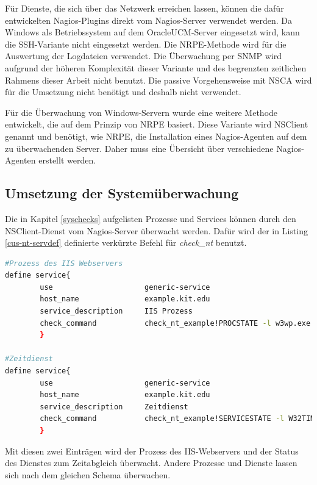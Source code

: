 Für Dienste, die sich über das Netzwerk erreichen lassen, können die dafür entwickelten Nagios-Plugins direkt vom Nagios-Server verwendet werden.
Da Windows als Betriebssystem auf dem \gls{OracleUCM}-Server eingesetzt wird, kann die \gls{SSH}-Variante nicht eingesetzt werden.
Die \gls{NRPE}-Methode wird für die Auswertung der Logdateien verwendet.
Die Überwachung per \gls{SNMP} wird aufgrund der höheren Komplexität dieser Variante und des begrenzten zeitlichen Rahmens dieser Arbeit nicht benutzt.\label{snmpkom}
Die passive Vorgehensweise mit \gls{NSCA} wird für die Umsetzung nicht benötigt und deshalb nicht verwendet.

Für die Überwachung von Windows-Servern wurde eine weitere Methode entwickelt, die auf dem Prinzip von \gls{NRPE} basiert.
Diese Variante wird NSClient genannt und benötigt, wie \gls{NRPE}, die Installation eines Nagios-Agenten auf dem zu überwachenden Server.
Daher muss eine Übersicht über verschiedene Nagios-Agenten erstellt werden.



\subsection{Umsetzung der Systemüberwachung}

Die in Kapitel \ref{syschecks} aufgelisten Prozesse und Services können durch den NSClient-Dienst vom Nagios-Server überwacht werden.
Dafür wird der in Listing \ref{cus-nt-servdef} definierte verkürzte Befehl für \textit{check\_nt} benutzt.

\begin{lstlisting}[captionpos=b, caption=Prozess- und Service-Check Servicedefintionen, label=procservdef, breaklines = true, language=sh]
#Prozess des IIS Webservers
define service{
        use                     generic-service
        host_name               example.kit.edu
        service_description     IIS Prozess
        check_command           check_nt_example!PROCSTATE -l w3wp.exe
        }

#Zeitdienst
define service{
        use                     generic-service
        host_name               example.kit.edu
        service_description     Zeitdienst
        check_command           check_nt_example!SERVICESTATE -l W32TIME
        }
\end{lstlisting}

Mit diesen zwei Einträgen wird der Prozess des \gls{IIS}-Webservers und der Status des Dienstes zum Zeitabgleich überwacht.
Andere Prozesse und Dienste lassen sich nach dem gleichen Schema überwachen.

